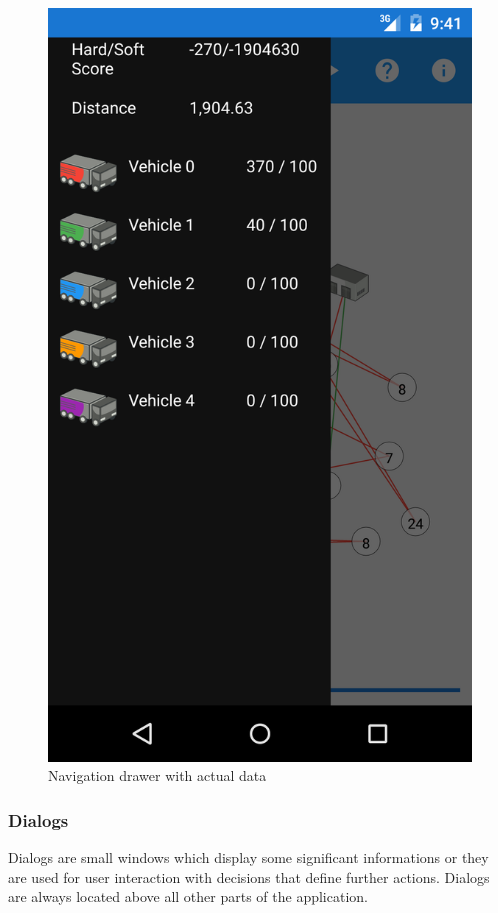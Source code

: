 \begin{figure}[h!]
    \centering
    \includegraphics[scale=0.15]{fig/nav_drawer.png}
    \caption{Navigation drawer with actual data}
    \label{NavigationDrawerFigure}
\end{figure}

\subsubsection{Dialogs}
Dialogs are small windows which display some significant informations or they are used for user interaction with
decisions that define further actions. Dialogs are always located above all other parts of the application.

